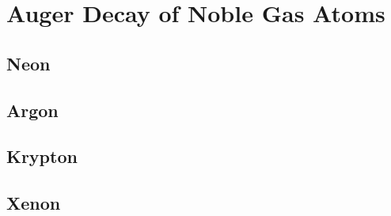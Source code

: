 \chapter{Auger Decay of Noble Gas Atoms}
\section{Neon}
\section{Argon}
\section{Krypton}
\section{Xenon}
